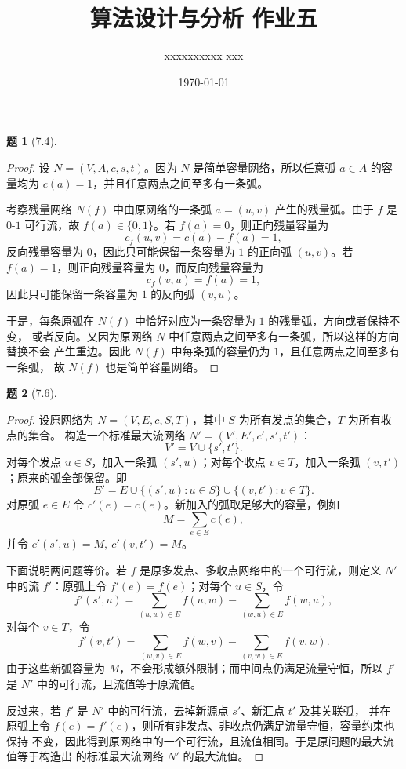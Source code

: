\documentclass[11pt, a4paper]{article}
\title{算法设计与分析 作业五}
\author{xxxxxxxxxx xxx}
\date{\today}
\newtheorem{problem}{题}
\begin{document}
\maketitle

\begin{problem}[7.4]
\end{problem}

\begin{proof}
    设 $N=(V,A,c,s,t)$。因为 $N$ 是简单容量网络，所以任意弧 $a\in A$ 的容量均为
    $c(a)=1$，并且任意两点之间至多有一条弧。

    考察残量网络 $N(f)$ 中由原网络的一条弧 $a=(u,v)$ 产生的残量弧。由于
    $f$ 是 $0$-$1$ 可行流，故 $f(a)\in\{0,1\}$。若 $f(a)=0$，则正向残量容量为
    \[
        c_f(u,v)=c(a)-f(a)=1,
    \]
    反向残量容量为 $0$，因此只可能保留一条容量为 $1$ 的正向弧 $(u,v)$。若
    $f(a)=1$，则正向残量容量为 $0$，而反向残量容量为
    \[
        c_f(v,u)=f(a)=1,
    \]
    因此只可能保留一条容量为 $1$ 的反向弧 $(v,u)$。

    于是，每条原弧在 $N(f)$ 中恰好对应为一条容量为 $1$ 的残量弧，方向或者保持不变，
    或者反向。又因为原网络 $N$ 中任意两点之间至多有一条弧，所以这样的方向替换不会
    产生重边。因此 $N(f)$ 中每条弧的容量仍为 $1$，且任意两点之间至多有一条弧，
    故 $N(f)$ 也是简单容量网络。
\end{proof}

\vspace{1em}

\begin{problem}[7.6]
\end{problem}

\begin{proof}
    设原网络为 $N=(V,E,c,S,T)$，其中 $S$ 为所有发点的集合，$T$ 为所有收点的集合。
    构造一个标准最大流网络 $N'=(V',E',c',s',t')$：
    \[
        V'=V\cup\{s',t'\}.
    \]
    对每个发点 $u\in S$，加入一条弧 $(s',u)$；对每个收点 $v\in T$，加入一条弧
    $(v,t')$；原来的弧全部保留。即
    \[
        E'=E\cup\{(s',u):u\in S\}\cup\{(v,t'):v\in T\}.
    \]
    对原弧 $e\in E$ 令 $c'(e)=c(e)$。新加入的弧取足够大的容量，例如
    \[
        M=\sum_{e\in E} c(e),
    \]
    并令 $c'(s',u)=M,\ c'(v,t')=M$。

    下面说明两问题等价。若 $f$ 是原多发点、多收点网络中的一个可行流，则定义
    $N'$ 中的流 $f'$：原弧上令 $f'(e)=f(e)$；对每个 $u\in S$，令
    \[
        f'(s',u)=\sum_{(u,w)\in E} f(u,w)-\sum_{(w,u)\in E} f(w,u),
    \]
    对每个 $v\in T$，令
    \[
        f'(v,t')=\sum_{(w,v)\in E} f(w,v)-\sum_{(v,w)\in E} f(v,w).
    \]
    由于这些新弧容量为 $M$，不会形成额外限制；而中间点仍满足流量守恒，所以 $f'$
    是 $N'$ 中的可行流，且流值等于原流值。

    反过来，若 $f'$ 是 $N'$ 中的可行流，去掉新源点 $s'$、新汇点 $t'$ 及其关联弧，
    并在原弧上令 $f(e)=f'(e)$，则所有非发点、非收点仍满足流量守恒，容量约束也保持
    不变，因此得到原网络中的一个可行流，且流值相同。于是原问题的最大流值等于构造出
    的标准最大流网络 $N'$ 的最大流值。
\end{proof}
\end{document}
